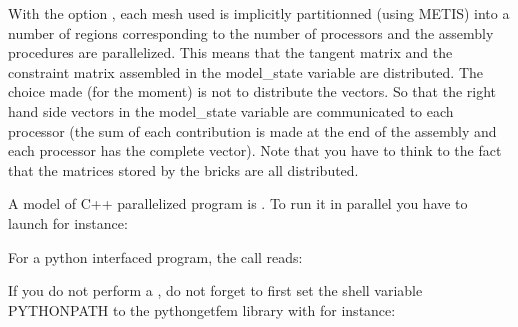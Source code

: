 \documentclass[a4paper,11pt,english]{sphinxmanual}
\begin{document}
With the option , each mesh used is implicitly
partitionned (using METIS) into a
number of regions corresponding to the number of processors and the assembly
procedures are parallelized. This means that the tangent matrix and the
constraint matrix assembled in the model\_state variable are distributed.
The choice made (for the moment) is not to distribute the vectors.
So that the right hand side vectors in the model\_state variable
are communicated to each processor (the sum of each contribution is made
at the end of the assembly and each processor has the complete vector).
Note that you have to think to the fact that the matrices stored by the
bricks are all distributed.

A model of C++ parallelized program is .
To run it in parallel you have to launch for instance:

\begin{sphinxVerbatim}[commandchars=\\\{\}]
    
\end{sphinxVerbatim}

For a python interfaced program, the call reads:

\begin{sphinxVerbatim}[commandchars=\\\{\}]
    
\end{sphinxVerbatim}

If you do not perform a , do not forget to first set the shell variable PYTHONPATH to the python\sphinxhyphen{}getfem library with for instance:

\begin{sphinxVerbatim}[commandchars=\\\{\}]
 
\end{sphinxVerbatim}
\end{document}
